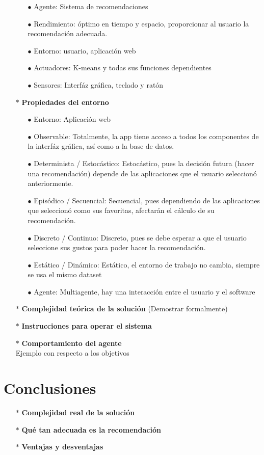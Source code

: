 \documentclass[10pt, a4paper]{article}
\begin{document}
\begin{enumerate}
\begin{enumerate}
\item[$\bullet$]Agente: Sistema de recomendaciones
\item[$\bullet$]Rendimiento: \'optimo en tiempo y espacio, proporcionar al usuario la recomendaci\'on adecuada.
\item[$\bullet$]Entorno: usuario, aplicaci\'on web
\item[$\bullet$]Actuadores: K-means y todas sus funciones dependientes
\item[$\bullet$]Sensores: Interf\'az gr\'afica, teclado y rat\'on
\end{enumerate}
\item[$\ast$]\textbf{Propiedades del entorno}
\begin{enumerate}
\item[$\bullet$]Entorno: Aplicaci\'on web
\item[$\bullet$]Observable: Totalmente, la app tiene acceso a todos los componentes de la interf\'az gr\'afica, as\'i como a la base de datos.
\item[$\bullet$]Determinista / Estoc\'astico: Estoc\'astico, pues la decisi\'on futura (hacer una recomendaci\'on) depende de las aplicaciones que el usuario seleccion\'o anteriormente. 
\item[$\bullet$]Epis\'odico / Secuencial: Secuencial, pues dependiendo de las aplicaciones que seleccion\'o como sus favoritas, afectar\'an el c\'alculo de su recomendaci\'on. 
\item[$\bullet$]Discreto / Continuo: Discreto, pues se debe esperar a que el usuario seleccione sus gustos para poder hacer la recomendaci\'on. 
\item[$\bullet$]Est\'atico / Din\'amico: Est\'atico, el entorno de trabajo no cambia, siempre se usa el mismo dataset 
\item[$\bullet$]Agente: Multiagente, hay una interacci\'on entre el usuario y el software
\end{enumerate}
\item[$\ast$]\textbf{Complejidad teórica de la solución} (Demostrar formalmente)
\item[$\ast$]\textbf{Instrucciones para operar el sistema}\\
\item[$\ast$]\textbf{Comportamiento del agente} \\
Ejemplo con respecto a los objetivos 
\end{enumerate}
\section{Conclusiones}
\begin{enumerate}
\item[$\ast$]\textbf{Complejidad real de la soluci\'on}
\item[$\ast$]\textbf{Qué tan adecuada es la recomendaci\'on}
\item[$\ast$]\textbf{Ventajas y desventajas}
\end{enumerate}
\end{document}
